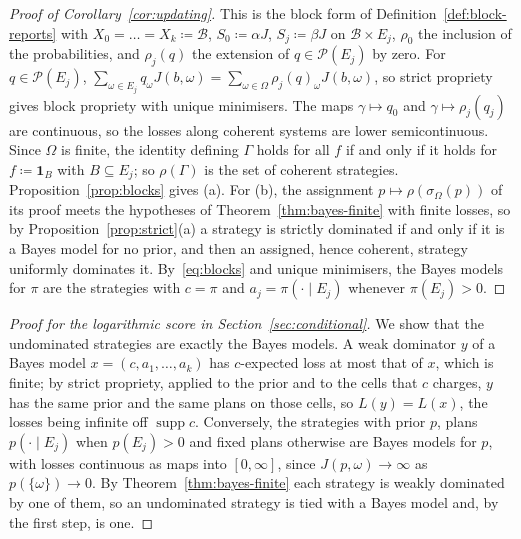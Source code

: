 \documentclass[11pt]{article}
\theoremstyle{definition}
\theoremstyle{remark}
\newcommand{\PP}{\mathcal P}
\newcommand{\one}{\mathbf 1}
\newcommand{\supp}{\operatorname{supp}}
\begin{document}
\begin{proof}[Proof of Corollary~\ref{cor:updating}]
This is the block form of Definition~\ref{def:block-reports} with $X_0=\dots=X_k\coloneqq\mathcal B$, $S_0\coloneqq\alpha J$, $S_j\coloneqq\beta J$ on $\mathcal B\times E_j$, $\rho_0$ the inclusion of the probabilities, and $\rho_j(q)$ the extension of $q\in\PP(E_j)$ by zero. For $q\in\PP(E_j)$, $\sum_{\omega\in E_j}q_\omega J(b,\omega)=\sum_{\omega\in\Omega}\rho_j(q)_\omega J(b,\omega)$, so strict propriety gives block propriety with unique minimisers. The maps $\gamma\mapsto q_0$ and $\gamma\mapsto\rho_j(q_j)$ are continuous, so the losses along coherent systems are lower semicontinuous. Since $\Omega$ is finite, the identity defining $\Gamma$ holds for all $f$ if and only if it holds for $f\coloneqq\one_B$ with $B\subseteq E_j$; so $\rho(\Gamma)$ is the set of coherent strategies. Proposition~\ref{prop:blocks} gives (a). For (b), the assignment $p\mapsto\rho(\sigma_\Omega(p))$ of its proof meets the hypotheses of Theorem~\ref{thm:bayes-finite} with finite losses, so by Proposition~\ref{prop:strict}(a) a strategy is strictly dominated if and only if it is a Bayes model for no prior, and then an assigned, hence coherent, strategy uniformly dominates it. By~\eqref{eq:blocks} and unique minimisers, the Bayes models for $\pi$ are the strategies with $c=\pi$ and $a_j=\pi(\cdot\mid E_j)$ whenever $\pi(E_j)>0$.
\end{proof}

\begin{proof}[Proof for the logarithmic score in Section~\ref{sec:conditional}]
We show that the undominated strategies are exactly the Bayes models. A weak dominator $y$ of a Bayes model $x=(c,a_1,\dots,a_k)$ has $c$-expected loss at most that of $x$, which is finite; by strict propriety, applied to the prior and to the cells that $c$ charges, $y$ has the same prior and the same plans on those cells, so $L(y)=L(x)$, the losses being infinite off $\supp c$. Conversely, the strategies with prior $p$, plans $p(\cdot\mid E_j)$ when $p(E_j)>0$ and fixed plans otherwise are Bayes models for $p$, with losses continuous as maps into $[0,\infty]$, since $J(p,\omega)\to\infty$ as $p(\{\omega\})\to0$. By Theorem~\ref{thm:bayes-finite} each strategy is weakly dominated by one of them, so an undominated strategy is tied with a Bayes model and, by the first step, is one.
\end{proof}
\end{document}
